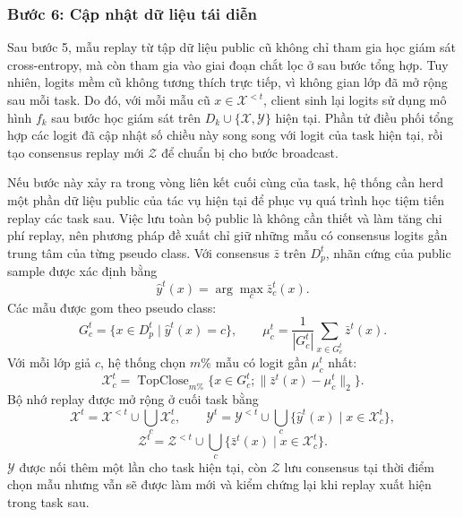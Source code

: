 \subsubsection{Bước 6: Cập nhật dữ liệu tái diễn}

Sau bước 5, mẫu replay từ tập dữ liệu public cũ không chỉ tham gia học giám sát cross-entropy, mà còn tham gia vào giai đoạn chắt lọc ở sau bước tổng hợp. Tuy nhiên, logits mềm cũ không tương thích trực tiếp, vì không gian lớp đã mở rộng sau mỗi task. Do đó, với mỗi mẫu cũ $x\in\mathcal X^{<t}$, client sinh lại logits sử dụng mô hình $f_k$ sau bước học giám sát trên $D_k \cup \{\mathcal X, \mathcal Y\}$ hiện tại. Phần tử điều phối tổng hợp các logit đã cập nhật số chiều này song song với logit của task hiện tại, rồi tạo consensus replay mới $\mathcal Z$ để chuẩn bị cho bước broadcast.

Nếu bước này xảy ra trong vòng liên kết cuối cùng của task, hệ thống cần herd một phần dữ liệu public của tác vụ hiện tại để phục vụ quá trình học tiệm tiến replay các task sau. Việc lưu toàn bộ public là không cần thiết và làm tăng chi phí replay, nên phương pháp đề xuất chỉ giữ những mẫu có consensus logits gần trung tâm của từng pseudo class. Với consensus $\bar z$ trên $D_p^t$, nhãn cứng của public sample được xác định bằng
\begin{equation}
\label{eq:pseudo_label}
\hat y^t(x)=\arg\max_c\bar z_c^t(x).
\end{equation}
Các mẫu được gom theo pseudo class:
\begin{equation}
\label{eq:pseudo_group}
G_c^t=\{x\in D_p^t\mid \hat y^t(x)=c\},
\qquad
\mu_c^t=\frac{1}{|G_c^t|}\sum_{x\in G_c^t}\bar z^t(x).
\end{equation}
Với mỗi lớp giả $c$, hệ thống chọn $m\%$ mẫu có logit gần $\mu_c^t$ nhất:
\begin{equation}
\label{eq:exemplar_select}
\mathcal X_c^t=\operatorname{TopClose}_{m\%}\{x\in G_c^t;\|\bar z^t(x)-\mu_c^t\|_2\}.
\end{equation}
Bộ nhớ replay được mở rộng ở cuối task bằng
\begin{equation}
\label{eq:memory_update_xy}
\mathcal X^t=\mathcal X^{<t}\cup\bigcup_c\mathcal X_c^t,
\qquad
\mathcal Y^t=\mathcal Y^{<t}\cup\bigcup_c\{\hat y^t(x)\mid x\in\mathcal X_c^t\},
\end{equation}
\begin{equation}
\label{eq:memory_update_z}
\mathcal Z^t=\mathcal Z^{<t}\cup\bigcup_c\{\bar z^t(x)\mid x\in\mathcal X_c^t\}.
\end{equation}
$\mathcal Y$ được nối thêm một lần cho task hiện tại, còn $\mathcal Z$ lưu consensus tại thời điểm chọn mẫu nhưng vẫn sẽ được làm mới và kiểm chứng lại khi replay xuất hiện trong task sau.

